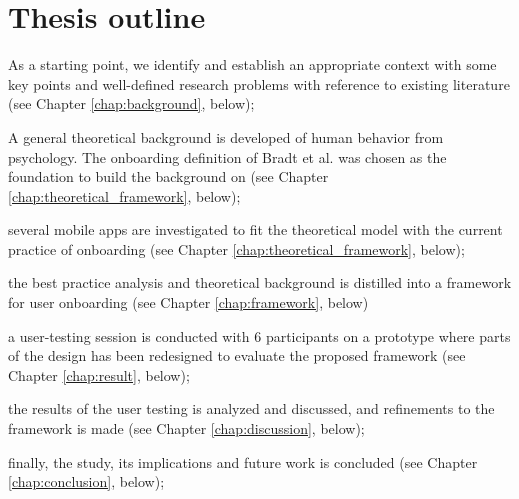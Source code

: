 \section{Thesis outline}
\begin{enumerate*}[label=(\(\arabic*\))]
  \item As a starting point, we identify and establish an appropriate context with some key points and well-defined research problems with reference to existing literature (see Chapter \ref{chap:background}, below);
  \item A general theoretical background is developed of human behavior from psychology. The onboarding definition of Bradt et al. \cite{Bradt2009} was chosen as the foundation to build the background on (see Chapter \ref{chap:theoretical_framework}, below);
  \item several mobile apps are investigated to fit the theoretical model with the current practice of onboarding (see Chapter \ref{chap:theoretical_framework}, below);
  \item the best practice analysis and theoretical background is distilled into a framework for user onboarding (see Chapter \ref{chap:framework}, below)
  \item a user-testing session is conducted with 6 participants on a prototype where parts of the design has been redesigned to evaluate the proposed framework (see Chapter \ref{chap:result}, below);
  \item the results of the user testing is analyzed and discussed, and refinements to the framework is made (see Chapter \ref{chap:discussion}, below);
  \item finally, the study, its implications and future work is concluded (see Chapter \ref{chap:conclusion}, below); 
\end{enumerate*}
